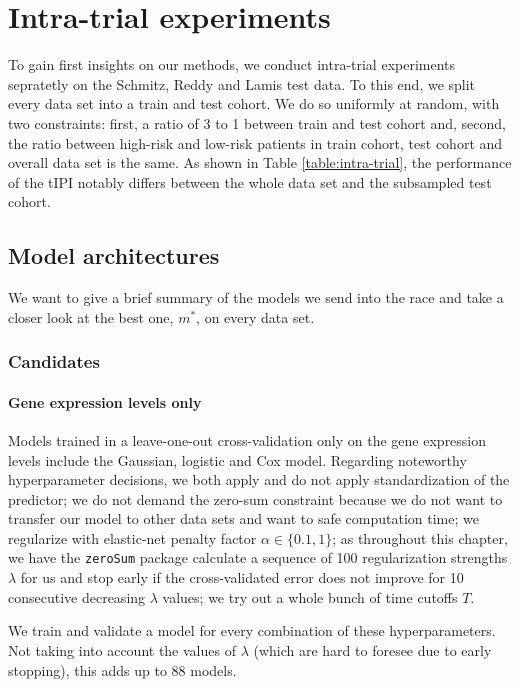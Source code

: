 \section{Intra-trial experiments}

To gain first insights on our methods, we conduct intra-trial experiments sepratetly on the 
Schmitz, Reddy and Lamis test data. To this end, we split every data set into a train and test 
cohort. We do so uniformly at random, with two constraints: first, a ratio of 3 to 1 between train 
and test cohort and, second, the ratio between high-risk and low-risk patients in train cohort, 
test cohort and overall data set is the same. As shown in Table \ref{table:intra-trial}, the 
performance of the tIPI notably differs between the whole data set and the subsampled test cohort. 



\subsection{Model architectures}

We want to give a brief summary of the models we send into the race and take a closer look at the 
best one, $m^*$, on every data set.

\subsubsection{Candidates}

\paragraph{Gene expression levels only}
Models trained in a leave-one-out cross-validation only on the gene expression levels include the 
Gaussian, logistic and Cox model. Regarding noteworthy hyperparameter decisions, we both apply and 
do not apply standardization of the predictor; we do not demand the zero-sum constraint 
because we do not want to transfer our model to other data sets and want to safe computation time;
we regularize with elastic-net penalty factor $\alpha \in \{ \num{0.1}, 1 \}$; as throughout this 
chapter, we have the \texttt{zeroSum} package calculate a sequence of \num{100} regularization strengths 
$\lambda$ for us and stop early if the cross-validated error does not improve for \num{10} 
consecutive decreasing $\lambda$ values; we try out a whole bunch of time cutoffs $T$.

We train and validate a model for every combination of these hyperparameters.
Not taking into account the values of $\lambda$ (which are hard to foresee due to early stopping), 
this adds up to \num{88} models.

